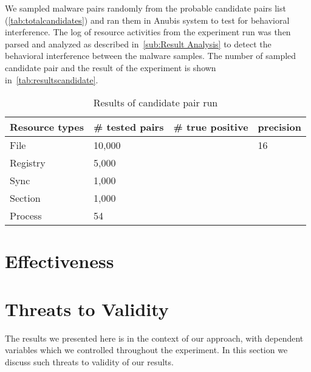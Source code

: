 We sampled malware pairs randomly from the probable candidate pairs list (\autoref{tab:totalcandidates}) and ran them in Anubis system to test for behavioral interference.
The log of resource activities from the experiment run was then parsed and analyzed as described in~\autoref{sub:Result Analysis} to detect the behavioral interference between the malware samples.
The number of sampled candidate pair and the result of the experiment is shown in~\autoref{tab:resultscandidate}.
\begin{table}[ht]
  \caption[Results of candidate pair run]{Results of candidate pair run}\label{tab:resultscandidate}
  \centering
  \begin{tabular}{l l l l}
    \toprule
    Resource types & \# tested pairs & \# true positive & precision\\
    \midrule
    File & 10,000 & & 16\\
    Registry & 5,000 & \\
    Sync & 1,000 & & \\
    Section & 1,000 & & \\
    Process & 54 & & \\
    \bottomrule
  \end{tabular}
\end{table}
\section{Effectiveness}
\label{sec:Effectiveness}

\section{Threats to Validity}
\label{sec:Threats to Validity}
The results we presented here is in the context of our approach, with dependent variables which we controlled throughout the experiment.
In this section we discuss such threats to validity of our results.


